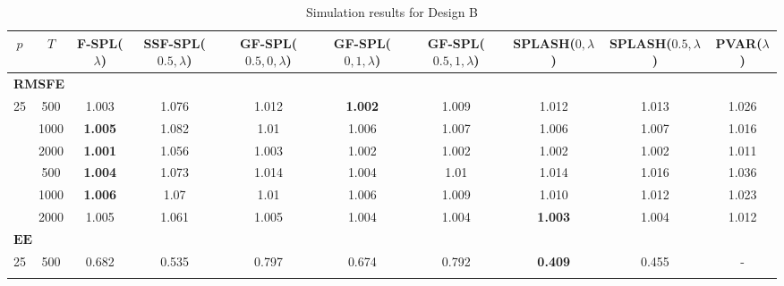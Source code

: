\begin{landscape}
    \bgroup
    \def\arraystretch{1.3}
    \begin{table}[p]
    \small
    \centering
    \caption{Simulation results for Design B}
    \label{tab:results_designB}
    \begin{tabular}{cccccccccc}    
    \hline \hline
    $p$  &  $T$   &  F-SPL($\lambda$)  & SSF-SPL($0.5, \lambda$)  &  GF-SPL($0.5, 0, \lambda$)  &  GF-SPL($0, 1, \lambda$)  &  GF-SPL($0.5, 1, \lambda$)  &  SPLASH($0, \lambda$)  &  SPLASH($0.5, \lambda$)  &  PVAR($\lambda$)  \\
    \hline
    \multicolumn{10}{l}{\textbf{RMSFE}} \\
	\hline
	 25  & 500  & 1.003              &           1.076           &            1.012            & \textbf{1.002}            &            1.009            & 1.012                  &          1.013           &       1.026       \\ \hdashline
	 25  & 1000 & \textbf{1.005}     &           1.082           &            1.01             & 1.006                     &            1.007            & 1.006                  &          1.007           &       1.016       \\ \hdashline
	 25  & 2000 & \textbf{1.001}     &           1.056           &            1.003            & 1.002                     &            1.002            & 1.002                  &          1.002           &       1.011       \\ \hdashline
	 36  & 500  & \textbf{1.004}     &           1.073           &            1.014            & 1.004                     &            1.01             & 1.014                  &          1.016           &       1.036       \\ \hdashline
	 36  & 1000 & \textbf{1.006}     &           1.07            &            1.01             & 1.006                     &            1.009            & 1.010                  &          1.012           &       1.023       \\ \hdashline
	 36  & 2000 & 1.005              &           1.061           &            1.005            & 1.004                     &            1.004            & \textbf{1.003}         &          1.004           &       1.012       \\
	\hline
	\multicolumn{10}{l}{$\mathbf{EE}$} \\
	\hline
	 25  & 500  &       0.682        &           0.535           &            0.797            &           0.674           &            0.792            & \textbf{0.409}         &          0.455           & -                 \\ \hdashline

\end{tabular}
\end{table}
\end{landscape}
